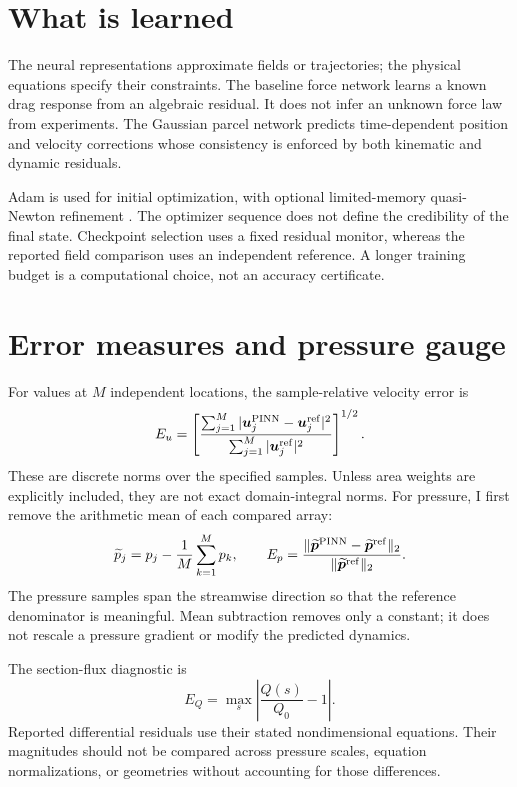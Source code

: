 \section{What is learned}
The neural representations approximate fields or trajectories; the
physical equations specify their constraints. The baseline force network
learns a known drag response from an algebraic residual. It does not infer
an unknown force law from experiments. The Gaussian parcel network predicts
time-dependent position and velocity corrections whose consistency is
enforced by both kinematic and dynamic residuals.

Adam is used for initial optimization, with optional limited-memory
quasi-Newton refinement \citep{kingma2015,liu1989}. The optimizer sequence
does not define the credibility of the final state. Checkpoint selection
uses a fixed residual monitor, whereas the reported field comparison uses
an independent reference. A longer training budget is a computational
choice, not an accuracy certificate.

\section{Error measures and pressure gauge}
For values at $M$ independent locations, the sample-relative velocity error
is
\begin{equation}
 E_u=\left[
 \frac{\sum_{j=1}^{M}|\bm{u}^{\mathrm{PINN}}_j-
               \bm{u}^{\mathrm{ref}}_j|^2}
      {\sum_{j=1}^{M}|\bm{u}^{\mathrm{ref}}_j|^2}
 \right]^{1/2}.
 \label{eq:velocity_error}
\end{equation}
These are discrete norms over the specified samples. Unless area weights
are explicitly included, they are not exact domain-integral norms. For
pressure, I first remove the arithmetic mean of each compared array:
\begin{equation}
 \widetilde p_j=p_j-\frac{1}{M}\sum_{k=1}^{M}p_k,\qquad
 E_p=\frac{\|\widetilde{\bm{p}}^{\mathrm{PINN}}-
                    \widetilde{\bm{p}}^{\mathrm{ref}}\|_2}
                   {\|\widetilde{\bm{p}}^{\mathrm{ref}}\|_2}.
 \label{eq:pressure_error}
\end{equation}
The pressure samples span the streamwise direction so that the reference
denominator is meaningful. Mean subtraction removes only a constant; it
does not rescale a pressure gradient or modify the predicted dynamics.

The section-flux diagnostic is
\begin{equation}
 E_Q=\max_s\left|\frac{Q(s)}{Q_0}-1\right|.
 \label{eq:flux_error}
\end{equation}
Reported differential residuals use their stated nondimensional equations.
Their magnitudes should not be compared across pressure scales, equation
normalizations, or geometries without accounting for those differences.

